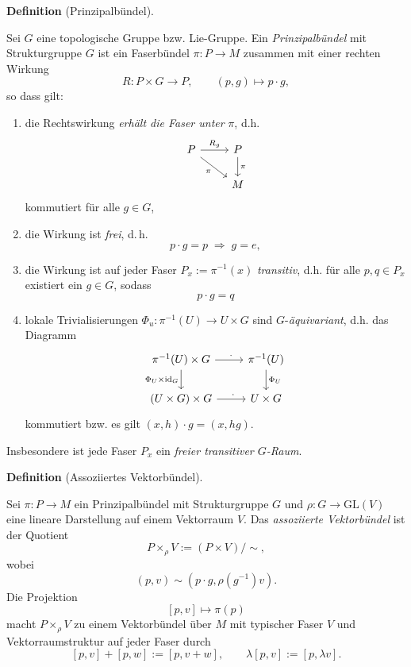 \documentclass[10pt, letterpaper]{article}
\newcommand{\id}{\operatorname{id}}
\newcommand{\GL}{\mathrm{GL}}
\newcommand{\CustomHeading}[3]{%
  \par\medskip\noindent%
  \textbf{#1 #2} \textnormal{(#3)}.\enskip%
}
\newenvironment{DEF}[2]{\CustomHeading{Definition}{#1}{#2}}{}
\begin{document}
\begin{DEF}{}{Prinzipalbündel}
Sei $G$ eine topologische Gruppe bzw. Lie-Gruppe. Ein \emph{Prinzipalbündel}
mit Strukturgruppe $G$ ist ein Faserbündel $\pi:P\to M$ zusammen mit einer rechten Wirkung
\[
R: P\times G\to P,\qquad (p,g)\mapsto p\cdot g,
\]
so dass gilt:
\begin{enumerate}
    \item die Rechtswirkung \emph{erhält die Faser unter} $\pi$, d.h. 
    \[
    \begin{tikzcd}
    P \arrow[r,"R_g"] \arrow[dr,"\pi"'] & P \arrow[d,"\pi"] \\
    & M
    \end{tikzcd}
    \]
    kommutiert für alle $g\in G$,
    \item die Wirkung ist \emph{frei}, d.\,h.
    \[
    p\cdot g=p \;\Rightarrow\; g=e,
    \]
    \item die Wirkung ist auf jeder Faser $P_x:=\pi^{-1}(x)$ \emph{transitiv}, d.h. für alle $p,q\in P_x$ existiert ein $g\in G$, sodass 
    $$p\cdot g=q$$
    \item lokale Trivialisierungen $\Phi_u:\pi^{-1}(U)\to U\times G$ sind $G$-\emph{äquivariant}, d.h. das Diagramm
    \[
    \begin{tikzcd}
    \pi^{-1}(U)\times G \arrow[r,"\ \ \cdot\ "] \arrow[d,"\Phi_U\times \id_G"'] & \pi^{-1}(U) \arrow[d,"\Phi_U"] \\
    (U\times G)\times G \arrow[r,"\ \ \cdot\ "] & U\times G
    \end{tikzcd}
    \]
    kommutiert bzw. es gilt $(x,h)\cdot g=(x,hg)$.
\end{enumerate}
Insbesondere ist jede Faser $P_x$ ein \emph{freier transitiver $G$-Raum}.
\end{DEF}


\begin{DEF}{}{Assoziiertes Vektorbündel}
Sei \(\pi:P\to M\) ein Prinzipalbündel mit Strukturgruppe \(G\) und $\rho:G\to \GL(V)$ eine lineare Darstellung auf einem Vektorraum \(V\). Das \emph{assoziierte Vektorbündel}
ist der Quotient
\[
P\times_\rho V:=(P\times V)/\sim,
\]
wobei
\[
(p,v)\sim (p\cdot g,\rho(g^{-1})v).
\]
Die Projektion
\[
[p,v]\mapsto \pi(p)
\]
macht \(P\times_\rho V\) zu einem Vektorbündel über \(M\) mit typischer Faser \(V\) und Vektorraumstruktur auf jeder Faser durch
\[
[p,v]+[p,w]:=[p,v+w],
\qquad
\lambda [p,v]:=[p,\lambda v].
\]
\end{DEF}
\end{document}
